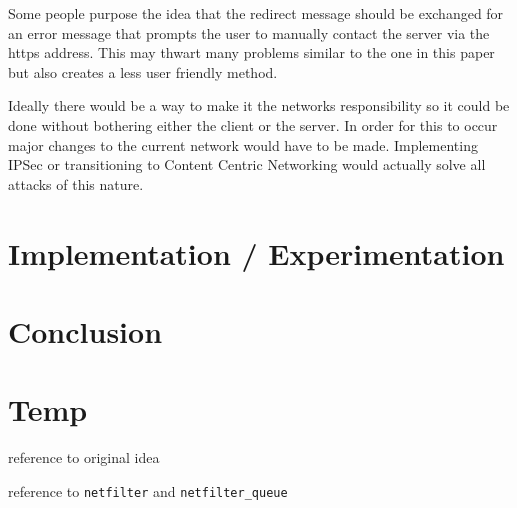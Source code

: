 \documentclass{article}
\begin{document}
Some people purpose the idea that the redirect message should be exchanged for an error message that prompts the user to manually contact the server via the https address.  This may thwart many problems similar to the one in this paper but also creates a less user friendly method.

Ideally there would be a way to make it the networks responsibility so it could be done without bothering either the client or the server.  In order for this to occur major changes to the current network would have to be made.  Implementing IPSec or transitioning to Content Centric Networking would actually solve all attacks of this nature.


\section{Implementation / Experimentation}

\section{Conclusion}

\section{Temp}

reference to original idea\cite{offpath}

reference to \texttt{netfilter}\cite{netfilter} and \texttt{netfilter\_queue}\cite{netfilterQueue}



\end{document}
